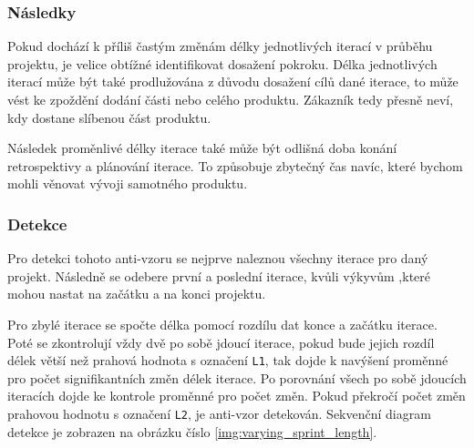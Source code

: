 \documentclass[czech,DP]{thesiskiv}
\begin{document}
\subsubsection{Následky}
Pokud dochází k příliš častým změnám délky jednotlivých iterací v průběhu projektu, je velice obtížné identifikovat dosažení pokroku. Délka jednotlivých iterací může být také prodlužována z důvodu dosažení cílů dané iterace, to může vést ke zpoždění dodání části nebo celého produktu. Zákazník tedy přesně neví, kdy dostane slíbenou část produktu. 
\par
Následek proměnlivé délky iterace také může být odlišná doba konání retrospektivy a plánování iterace. To způsobuje zbytečný čas navíc, které bychom mohli věnovat vývoji samotného produktu. \cite{scrum_but_anti_patterns}
\subsubsection{Detekce}
Pro detekci tohoto anti-vzoru se nejprve naleznou všechny iterace pro daný projekt. Následně se odebere první a poslední iterace, kvůli výkyvům ,které mohou nastat na začátku a na konci projektu. 
\par
Pro zbylé iterace se spočte délka pomocí rozdílu dat konce a začátku iterace. Poté se zkontrolují vždy dvě po sobě jdoucí iterace, pokud bude jejich rozdíl délek větší než prahová hodnota s označení \texttt{L1}, tak dojde k navýšení proměnné pro počet signifikantních změn délek iterace. Po porovnání všech po sobě jdoucích iteracích dojde ke kontrole proměnné pro počet změn. Pokud překročí počet změn prahovou hodnotu s označení \texttt{L2}, je anti-vzor detekován. Sekvenční diagram detekce je zobrazen na obrázku číslo \ref{img:varying_sprint_length}.
\end{document}
